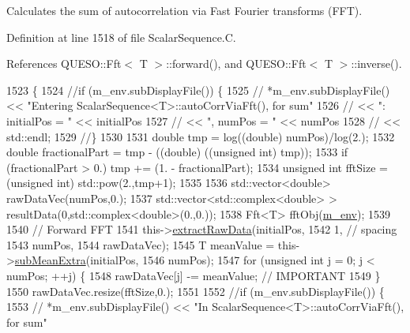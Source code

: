Calculates the sum of autocorrelation via Fast Fourier transforms (F\-F\-T). 



Definition at line 1518 of file Scalar\-Sequence.\-C.



References Q\-U\-E\-S\-O\-::\-Fft$<$ T $>$\-::forward(), and Q\-U\-E\-S\-O\-::\-Fft$<$ T $>$\-::inverse().


\begin{DoxyCode}
1523 \{
1524   \textcolor{comment}{//if (m\_env.subDisplayFile()) \{}
1525   \textcolor{comment}{//  *m\_env.subDisplayFile() << "Entering ScalarSequence<T>::autoCorrViaFft(), for sum"}
1526   \textcolor{comment}{//                          << ": initialPos = " << initialPos}
1527   \textcolor{comment}{//                          << ", numPos = "     << numPos}
1528   \textcolor{comment}{//                          << std::endl;}
1529   \textcolor{comment}{//\}}
1530 
1531   \textcolor{keywordtype}{double} tmp = log((\textcolor{keywordtype}{double}) numPos)/log(2.);
1532   \textcolor{keywordtype}{double} fractionalPart = tmp - ((double) ((\textcolor{keywordtype}{unsigned} \textcolor{keywordtype}{int}) tmp));
1533   \textcolor{keywordflow}{if} (fractionalPart > 0.) tmp += (1. - fractionalPart);
1534   \textcolor{keywordtype}{unsigned} \textcolor{keywordtype}{int} fftSize = (\textcolor{keywordtype}{unsigned} int) std::pow(2.,tmp+1);
1535 
1536   std::vector<double> rawDataVec(numPos,0.);
1537   std::vector<std::complex<double> > resultData(0,std::complex<double>(0.,0.));
1538   Fft<T> fftObj(\hyperlink{class_q_u_e_s_o_1_1_scalar_sequence_a71618cd6351b29361b437af68447a4c8}{m\_env});
1539 
1540   \textcolor{comment}{// Forward FFT}
1541   this->\hyperlink{class_q_u_e_s_o_1_1_scalar_sequence_a998c8f01c49c06076f2ce97a51d4ab2c}{extractRawData}(initialPos,
1542                        1, \textcolor{comment}{// spacing}
1543                        numPos,
1544                        rawDataVec);
1545   T meanValue = this->\hyperlink{class_q_u_e_s_o_1_1_scalar_sequence_a65e9208ee2d0443ad28b29141297153c}{subMeanExtra}(initialPos,
1546                                    numPos);
1547   \textcolor{keywordflow}{for} (\textcolor{keywordtype}{unsigned} \textcolor{keywordtype}{int} j = 0; j < numPos; ++j) \{
1548     rawDataVec[j] -= meanValue; \textcolor{comment}{// IMPORTANT}
1549   \}
1550   rawDataVec.resize(fftSize,0.);
1551 
1552   \textcolor{comment}{//if (m\_env.subDisplayFile()) \{}
1553   \textcolor{comment}{//  *m\_env.subDisplayFile() << "In ScalarSequence<T>::autoCorrViaFft(), for sum"}

\end{DoxyCode}
